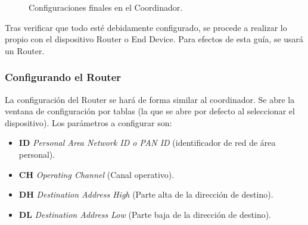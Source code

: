 \begin{figure}[H] %
\caption{Configuraciones finales en el Coordinador.}
\label{fig:CoordAll}
\end{figure}

Tras verificar que todo esté debidamente configurado, se procede a realizar lo propio con el dispositivo Router o End Device. Para efectos de esta guía, se usará un Router.

\subsubsection{Configurando el Router}
La configuración del Router se hará de forma similar al coordinador. Se abre la ventana de configuración por tablas (la que se abre por defecto al seleccionar el dispositivo). Los parámetros a configurar son:

\begin{itemize}
	\item \textbf{ID} \textit{Personal Area Network ID o PAN ID} (identificador de red de área personal). 
	\item \textbf{CH} \textit{Operating Channel} (Canal operativo).
	\item \textbf{DH} \textit{Destination Address High} (Parte alta de la dirección de destino).
	\item \textbf{DL} \textit{Destination Address Low} (Parte baja de la dirección de destino).
\end{itemize}

